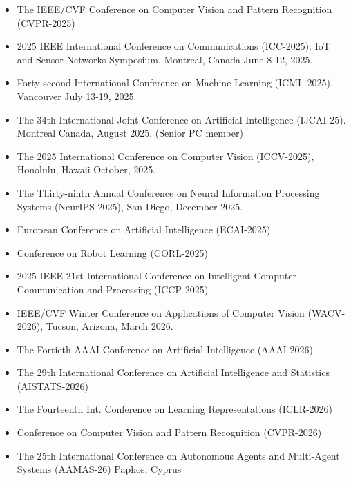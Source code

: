 \begin{itemize}
\item The IEEE/CVF Conference on Computer Vision and Pattern Recognition (CVPR-2025)

\item 2025 IEEE International Conference on Communications (ICC-2025): IoT and Sensor Networks Symposium. Montreal, Canada June 8-12, 2025.

\item Forty-second International Conference on Machine Learning
(ICML-2025). Vancouver July 13-19, 2025.

\item The 34th International Joint Conference on Artificial Intelligence (IJCAI-25). Montreal Canada, August 2025. (Senior PC member)

\item The 2025 International Conference on Computer Vision (ICCV-2025), Honolulu, Hawaii October, 2025.

\item The Thirty-ninth Annual Conference on Neural Information Processing Systems (NeurIPS-2025), San Diego, December 2025.

\item European Conference on Artificial Intelligence (ECAI-2025)

\item Conference on Robot Learning (CORL-2025)


\item 2025 IEEE 21st International Conference on Intelligent Computer Communication and Processing (ICCP-2025)


\item IEEE/CVF Winter Conference on Applications of Computer Vision (WACV-2026), Tucson, Arizona, March 2026.

\item The Fortieth AAAI Conference on Artificial Intelligence (AAAI-2026)

\item The 29th International Conference on Artificial Intelligence and Statistics (AISTATS-2026)

\item The Fourteenth Int. Conference on Learning Representations (ICLR-2026)

\item Conference on Computer Vision and Pattern Recognition (CVPR-2026)

\item The 25th International Conference on Autonomous Agents and Multi-Agent Systems (AAMAS-26) Paphos, Cyprus


\end{itemize}
